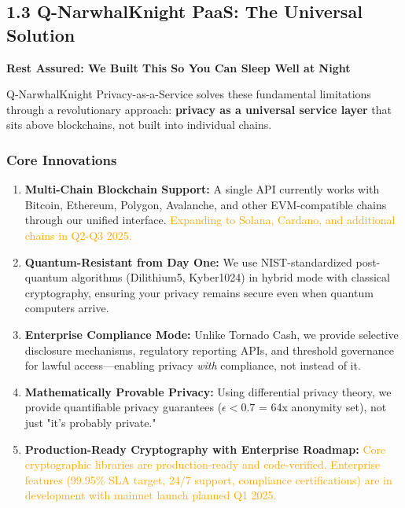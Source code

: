 \documentclass[11pt,a4paper]{article}
\begin{document}
\subsection{1.3 Q-NarwhalKnight PaaS: The Universal Solution}

\textbf{Rest Assured: We Built This So You Can Sleep Well at Night}

Q-NarwhalKnight Privacy-as-a-Service solves these fundamental limitations through a revolutionary approach: \textbf{privacy as a universal service layer} that sits above blockchains, not built into individual chains.

\subsubsection{Core Innovations}

\begin{enumerate}
    \item \textbf{Multi-Chain Blockchain Support:} A single API currently works with Bitcoin, Ethereum, Polygon, Avalanche, and other EVM-compatible chains through our unified interface. \textcolor{orange}{Expanding to Solana, Cardano, and additional chains in Q2-Q3 2025.}

    \item \textbf{Quantum-Resistant from Day One:} We use NIST-standardized post-quantum algorithms (Dilithium5, Kyber1024) in hybrid mode with classical cryptography, ensuring your privacy remains secure even when quantum computers arrive.

    \item \textbf{Enterprise Compliance Mode:} Unlike Tornado Cash, we provide selective disclosure mechanisms, regulatory reporting APIs, and threshold governance for lawful access—enabling privacy \textit{with} compliance, not instead of it.

    \item \textbf{Mathematically Provable Privacy:} Using differential privacy theory, we provide quantifiable privacy guarantees ($\epsilon < 0.7$ = 64x anonymity set), not just "it's probably private."

    \item \textbf{Production-Ready Cryptography with Enterprise Roadmap:} \textcolor{orange}{Core cryptographic libraries are production-ready and code-verified. Enterprise features (99.95\% SLA target, 24/7 support, compliance certifications) are in development with mainnet launch planned Q1 2025.}
\end{enumerate}
\end{document}
